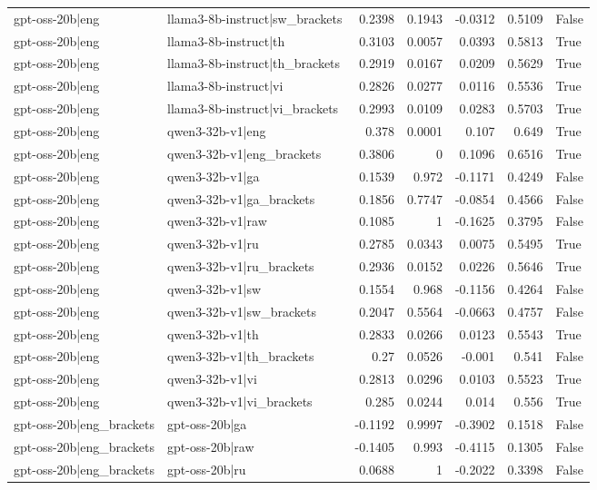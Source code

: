 \begin{table}
\begin{tabular}{l l r r r r l}
gpt-oss-20b|eng & llama3-8b-instruct|sw_brackets & 0.2398 & 0.1943 & -0.0312 & 0.5109 & False \\
gpt-oss-20b|eng & llama3-8b-instruct|th & 0.3103 & 0.0057 & 0.0393 & 0.5813 & True \\
gpt-oss-20b|eng & llama3-8b-instruct|th_brackets & 0.2919 & 0.0167 & 0.0209 & 0.5629 & True \\
gpt-oss-20b|eng & llama3-8b-instruct|vi & 0.2826 & 0.0277 & 0.0116 & 0.5536 & True \\
gpt-oss-20b|eng & llama3-8b-instruct|vi_brackets & 0.2993 & 0.0109 & 0.0283 & 0.5703 & True \\
gpt-oss-20b|eng & qwen3-32b-v1|eng & 0.378 & 0.0001 & 0.107 & 0.649 & True \\
gpt-oss-20b|eng & qwen3-32b-v1|eng_brackets & 0.3806 & 0 & 0.1096 & 0.6516 & True \\
gpt-oss-20b|eng & qwen3-32b-v1|ga & 0.1539 & 0.972 & -0.1171 & 0.4249 & False \\
gpt-oss-20b|eng & qwen3-32b-v1|ga_brackets & 0.1856 & 0.7747 & -0.0854 & 0.4566 & False \\
gpt-oss-20b|eng & qwen3-32b-v1|raw & 0.1085 & 1 & -0.1625 & 0.3795 & False \\
gpt-oss-20b|eng & qwen3-32b-v1|ru & 0.2785 & 0.0343 & 0.0075 & 0.5495 & True \\
gpt-oss-20b|eng & qwen3-32b-v1|ru_brackets & 0.2936 & 0.0152 & 0.0226 & 0.5646 & True \\
gpt-oss-20b|eng & qwen3-32b-v1|sw & 0.1554 & 0.968 & -0.1156 & 0.4264 & False \\
gpt-oss-20b|eng & qwen3-32b-v1|sw_brackets & 0.2047 & 0.5564 & -0.0663 & 0.4757 & False \\
gpt-oss-20b|eng & qwen3-32b-v1|th & 0.2833 & 0.0266 & 0.0123 & 0.5543 & True \\
gpt-oss-20b|eng & qwen3-32b-v1|th_brackets & 0.27 & 0.0526 & -0.001 & 0.541 & False \\
gpt-oss-20b|eng & qwen3-32b-v1|vi & 0.2813 & 0.0296 & 0.0103 & 0.5523 & True \\
gpt-oss-20b|eng & qwen3-32b-v1|vi_brackets & 0.285 & 0.0244 & 0.014 & 0.556 & True \\
gpt-oss-20b|eng_brackets & gpt-oss-20b|ga & -0.1192 & 0.9997 & -0.3902 & 0.1518 & False \\
gpt-oss-20b|eng_brackets & gpt-oss-20b|raw & -0.1405 & 0.993 & -0.4115 & 0.1305 & False \\
gpt-oss-20b|eng_brackets & gpt-oss-20b|ru & 0.0688 & 1 & -0.2022 & 0.3398 & False \\

\end{tabular}
\end{table}
